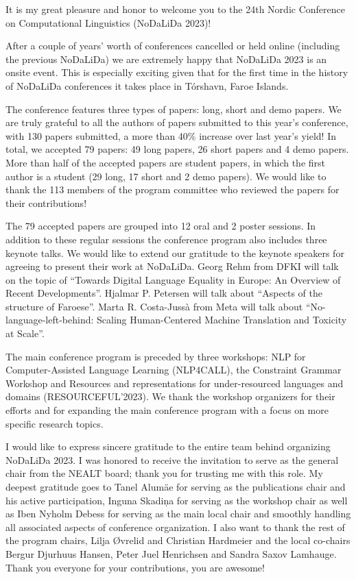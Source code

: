 \setlength{\parskip}{0.3cm}%

It is my great pleasure and honor to welcome you to the 24th Nordic Conference on Computational Linguistics (NoDaLiDa 2023)!

After a couple of years’ worth of conferences cancelled or held online (including the previous NoDaLiDa) we are extremely happy that NoDaLiDa 2023 is an onsite event. This is especially exciting given that for the first time in the history of NoDaLiDa conferences it takes place in Tórshavn, Faroe Islands.

The conference features three types of papers: long, short and demo papers. We are truly grateful to all the authors of papers submitted to this year’s conference, with 130 papers submitted, a more than 40\% increase over last year’s yield! In total, we accepted 79 papers: 49 long papers, 26 short papers and 4 demo papers. More than half of the accepted papers are student papers, in which the first author is a student (29 long, 17 short and 2 demo papers). We would like to thank the 113 members of the program committee who reviewed the papers for their contributions!

The 79 accepted papers are grouped into 12 oral and 2 poster sessions. In addition to these regular sessions the conference program also includes three keynote talks. We would like to extend our gratitude to the keynote speakers for agreeing to present their work at NoDaLiDa. Georg Rehm from DFKI will talk on the topic of ``Towards Digital Language Equality in Europe: An Overview of Recent Developments''. Hjalmar P. Petersen will talk about ``Aspects of the structure of Faroese''. Marta R. Costa-Jussà from Meta will talk about ``No-language-left-behind: Scaling Human-Centered Machine Translation and Toxicity at Scale''.

The main conference program is preceded by three workshops: NLP for Computer-Assisted Language Learning (NLP4CALL), the Constraint Grammar Workshop and Resources and representations for under-resourced languages and domains (RESOURCEFUL'2023). We thank the workshop organizers for their efforts and for expanding the main conference program with a focus on more specific research topics.

I would like to express sincere gratitude to the entire team behind organizing NoDaLiDa 2023. I was honored to receive the invitation to serve as the general chair from the NEALT board; thank you for trusting me with this role. My deepest gratitude goes to Tanel Alumäe for serving as the publications chair and his active participation, Inguna Skadiņa for serving as the workshop chair as well as Iben Nyholm Debess for serving as the main local chair and smoothly handling all associated aspects of conference organization. I also want to thank the rest of the program chairs, Lilja Øvrelid and Christian Hardmeier and the local co-chairs Bergur Djurhuus Hansen, Peter Juel Henrichsen and Sandra Saxov Lamhauge. Thank you everyone for your contributions, you are awesome!


